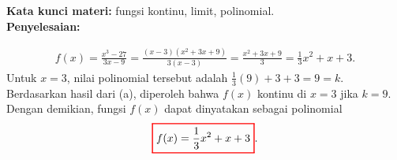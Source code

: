 \documentclass[10pt,openany,a4paper]{article}
\theoremstyle{definition}
\theoremstyle{definition}
\theoremstyle{plain}
\newenvironment{jawab}[2][tes]{%
\par\noindent\textbf{Kata kunci materi:} #1.\\
\textbf{Penyelesaian:} #2%
}{}
\begin{document}
\begin{enumerate}
\begin{jawab}[fungsi kontinu, limit, polinomial]
{\begin{enumerate}
        \begin{align*}
            f(x) = \frac{x^3 - 27}{3x - 9} = \frac{(x-3)(x^2 + 3x + 9)}{3(x-3)} = \frac{x^2 + 3x + 9}{3} = \frac{1}{3}x^2 + x + 3.
        \end{align*}
        Untuk $x=3$, nilai polinomial tersebut adalah $\frac{1}{3}(9)+3+3=9=k$. Berdasarkan hasil dari (a), diperoleh bahwa \(f(x)\) kontinu di \(x=3\) jika \(k=9\). Dengan demikian, fungsi \(f(x)\) dapat dinyatakan sebagai polinomial
        \begin{align*}
            \colorlet{oldcolor}{.}
        \color{red}
        \setlength{\fboxrule}{1pt} \boxed{\color{oldcolor}f(x) = \frac{1}{3}x^2 + x + 3}\color{oldcolor}.
        \end{align*}
        \end{enumerate}
    }
    \end{jawab}


\end{enumerate}
\end{document}
